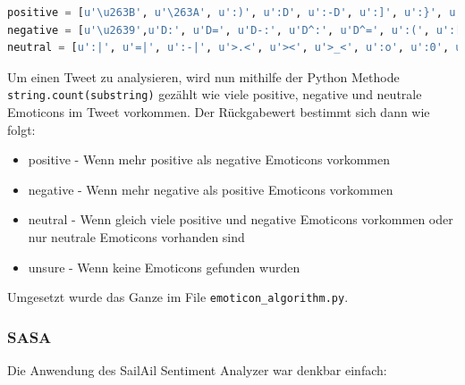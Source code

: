 \begin{lstlisting}[language=Python, caption={Emoticon Arrays}, label={lst:emoticonlisting}]
positive = [u'\u263B', u'\263A', u':)', u':D', u':-D', u':]', u':}', u':o)', u':o]', u':o}', u':-]', u':-)', u':-}', u'=)', u'=]', u'=}', u'=^]', u'=^)', u'=^}', u':B', u':-D', u':-B', u':^D', u':^B', u'=B', u'=^B', u'=^D', u':\'), u':\']', u':\'}', u'<3', u'^.^', u'^-^', u'^_^', u'^^', u':*', u'=*', u':-*', u';)', u';]', u';}', u':-p', u':-P', u':-b', u':^p', u':^P', u':^b', u'=P', u'=p', u'/o/', u':P', u':p', u':b', u'=b', u'=^p', u'=^P', u'=^b', u'\o/']
negative = [u'\u2639',u'D:', u'D=', u'D-:', u'D^:', u'D^=', u':(', u':[', u':{', u':o(', u':o[', u':^(', u':^[', u':^{', u'=^(', u'=^{', u'>=(', u'>=[', u'>={', u'>=(', u'>:-{', u'>:-[', u'>:-(', u'>=^[', u'>:-(', u':-[', u':-(', u'=(', u'=[', u'={', u'=^[', u'>:-=(', u'>=[', u'>=^(', u'=\\', u':\\', u'=/', u'=$', u'o.O', u'O_o', u'Oo', u':$:-{', u'>:-{', u'>=^{', u':o{']
neutral = [u':|', u'=|', u':-|', u'>.<', u'><', u'>_<', u':o', u':0', u'=O', u':@', u'=@', u':^o', u':^@', u'-.-', u'-_-', u':x', u'=X', u':-x', u':-@', u':-#', u':^x']
\end{lstlisting}

Um einen Tweet zu analysieren, wird nun mithilfe der Python Methode \lstinline$string.count(substring)$ gezählt wie viele positive, negative und neutrale Emoticons im Tweet vorkommen. Der Rückgabewert bestimmt sich dann wie folgt:

\begin{itemize}
	\item positive - Wenn mehr positive als negative Emoticons vorkommen
	\item negative - Wenn mehr negative als positive Emoticons vorkommen
	\item neutral - Wenn gleich viele positive und negative Emoticons vorkommen oder nur neutrale Emoticons vorhanden sind
	\item unsure - Wenn keine Emoticons gefunden wurden
\end{itemize} 

Umgesetzt wurde das Ganze im File \lstinline$emoticon_algorithm.py$.

\subsubsection{SASA}
Die Anwendung des SailAil Sentiment Analyzer war denkbar einfach:

